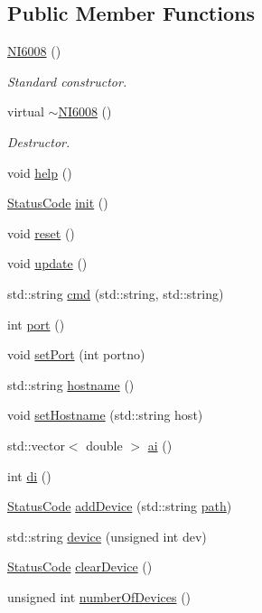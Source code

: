 \subsection*{Public Member Functions}
\begin{DoxyCompactItemize}
\item 
\hyperlink{classNI6008_a7bcb7ee18fa9f17f3582bc3940de8eaa}{N\+I6008} ()
\begin{DoxyCompactList}\small\item\em Standard constructor. \end{DoxyCompactList}\item 
virtual \hyperlink{classNI6008_a31832f3501f4741fdf8616a44a2f4fc8}{$\sim$\+N\+I6008} ()
\begin{DoxyCompactList}\small\item\em Destructor. \end{DoxyCompactList}\item 
void \hyperlink{classNI6008_ab58d458dbd895b97f7aa51c52b5cd714}{help} ()
\item 
\hyperlink{classStatusCode}{Status\+Code} \hyperlink{classNI6008_ab6a993713c9562e78c634fb30f31b130}{init} ()
\item 
void \hyperlink{classNI6008_a8fd2303c006beba3ceeeac3beb6aaa5e}{reset} ()
\item 
void \hyperlink{classNI6008_a7e04c07277c7bc2b36c197a93edbc278}{update} ()
\item 
std\+::string \hyperlink{classNI6008_a0d7584a656abca03fd59c555cb66822c}{cmd} (std\+::string, std\+::string)
\item 
int \hyperlink{classNI6008_a76df6d88710b15448145498cebe65228}{port} ()
\item 
void \hyperlink{classNI6008_a6bad72fc5a2edb4e3ac0ff8db3a458fd}{set\+Port} (int portno)
\item 
std\+::string \hyperlink{classNI6008_a124e9f3daa92c396b6f66fb1c29a686d}{hostname} ()
\item 
void \hyperlink{classNI6008_a509a804fa21b9f9f5f959b85d5abf5ba}{set\+Hostname} (std\+::string host)
\item 
std\+::vector$<$ double $>$ \hyperlink{classNI6008_a0a4ea75184069707de9f0e76f370582e}{ai} ()
\item 
int \hyperlink{classNI6008_a570edfad9c7a246a8ade767092c5fcbc}{di} ()
\item 
\hyperlink{classStatusCode}{Status\+Code} \hyperlink{classNI6008_aa1964d9926c122e67a6c8dc570b249ff}{add\+Device} (std\+::string \hyperlink{classHierarchy_aa7990fa7caf132d83e361ce033c6c65a}{path})
\item 
std\+::string \hyperlink{classNI6008_a6535ca8405fae42942e7011684113774}{device} (unsigned int dev)
\item 
\hyperlink{classStatusCode}{Status\+Code} \hyperlink{classNI6008_a0cdfc8c62074d5bbc212e1825ac10e99}{clear\+Device} ()
\item 
unsigned int \hyperlink{classNI6008_a293fbf44b101e82a57404d1c76f07a87}{number\+Of\+Devices} ()
\end{DoxyCompactItemize}
